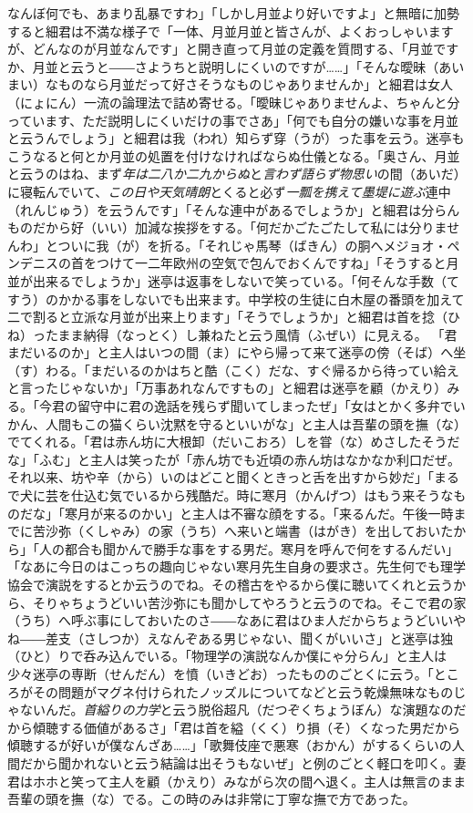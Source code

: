 \documentclass{book}
\begin{document}
なんぼ何でも、あまり乱暴ですわ」「しかし月並より好いですよ」と無暗に加勢すると細君は不満な様子で「一体、月並月並と皆さんが、よくおっしゃいますが、どんなのが月並なんです」と開き直って月並の定義を質問する、「月並ですか、月並と云うと――さようちと説明しにくいのですが\ldots{}\ldots{}」「そんな曖昧（あいまい）なものなら月並だって好さそうなものじゃありませんか」と細君は女人（にょにん）一流の論理法で詰め寄せる。「曖昧じゃありませんよ、ちゃんと分っています、ただ説明しにくいだけの事でさあ」「何でも自分の嫌いな事を月並と云うんでしょう」と細君は我（われ）知らず穿（うが）った事を云う。迷亭もこうなると何とか月並の処置を付けなければならぬ仕儀となる。「奥さん、月並と云うのはね、まず\emph{年は二八か二九からぬ}と\emph{言わず語らず物思い}の間（あいだ）に寝転んでいて、\emph{この日や天気晴朗}とくると必ず\emph{一瓢を携えて墨堤に遊ぶ}連中（れんじゅう）を云うんです」「そんな連中があるでしょうか」と細君は分らんものだから好（いい）加減な挨拶をする。「何だかごたごたして私には分りませんわ」とついに我（が）を折る。「それじゃ馬琴（ばきん）の胴へメジョオ・ペンデニスの首をつけて一二年欧州の空気で包んでおくんですね」「そうすると月並が出来るでしょうか」迷亭は返事をしないで笑っている。「何そんな手数（てすう）のかかる事をしないでも出来ます。中学校の生徒に白木屋の番頭を加えて二で割ると立派な月並が出来上ります」「そうでしょうか」と細君は首を捻（ひね）ったまま納得（なっとく）し兼ねたと云う風情（ふぜい）に見える。
「君まだいるのか」と主人はいつの間（ま）にやら帰って来て迷亭の傍（そば）へ坐（す）わる。「まだいるのかはちと酷（こく）だな、すぐ帰るから待ってい給えと言ったじゃないか」「万事あれなんですもの」と細君は迷亭を顧（かえり）みる。「今君の留守中に君の逸話を残らず聞いてしまったぜ」「女はとかく多弁でいかん、人間もこの猫くらい沈黙を守るといいがな」と主人は吾輩の頭を撫（な）でてくれる。「君は赤ん坊に大根卸（だいこおろ）しを甞（な）めさしたそうだな」「ふむ」と主人は笑ったが「赤ん坊でも近頃の赤ん坊はなかなか利口だぜ。それ以来、坊や辛（から）いのはどこと聞くときっと舌を出すから妙だ」「まるで犬に芸を仕込む気でいるから残酷だ。時に寒月（かんげつ）はもう来そうなものだな」「寒月が来るのかい」と主人は不審な顔をする。「来るんだ。午後一時までに苦沙弥（くしゃみ）の家（うち）へ来いと端書（はがき）を出しておいたから」「人の都合も聞かんで勝手な事をする男だ。寒月を呼んで何をするんだい」「なあに今日のはこっちの趣向じゃない寒月先生自身の要求さ。先生何でも理学協会で演説をするとか云うのでね。その稽古をやるから僕に聴いてくれと云うから、そりゃちょうどいい苦沙弥にも聞かしてやろうと云うのでね。そこで君の家（うち）へ呼ぶ事にしておいたのさ――なあに君はひま人だからちょうどいいやね――差支（さしつか）えなんぞある男じゃない、聞くがいいさ」と迷亭は独（ひと）りで呑み込んでいる。「物理学の演説なんか僕にゃ分らん」と主人は少々迷亭の専断（せんだん）を憤（いきどお）ったもののごとくに云う。「ところがその問題がマグネ付けられたノッズルについてなどと云う乾燥無味なものじゃないんだ。\emph{首縊りの力学}と云う脱俗超凡（だつぞくちょうぼん）な演題なのだから傾聴する価値があるさ」「君は首を縊（くく）り損（そ）くなった男だから傾聴するが好いが僕なんざあ\ldots{}\ldots{}」「歌舞伎座で悪寒（おかん）がするくらいの人間だから聞かれないと云う結論は出そうもないぜ」と例のごとく軽口を叩く。妻君はホホと笑って主人を顧（かえり）みながら次の間へ退く。主人は無言のまま吾輩の頭を撫（な）でる。この時のみは非常に丁寧な撫で方であった。
\end{document}
